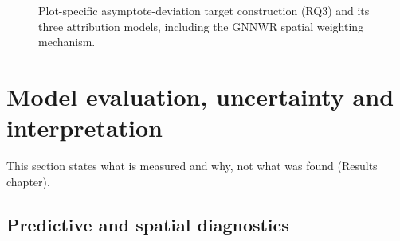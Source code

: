 %
\begin{figure}[!htbp]
\centering
{}
\caption{Plot-specific asymptote-deviation target construction (RQ3) and its three attribution
models, including the GNNWR spatial weighting mechanism.}
\label{fig:rq3-attribution}
\end{figure}

\section{Model evaluation, uncertainty and interpretation}
\label{sec:evaluation}

This section states what is measured and why, not what was found (Results chapter).

\subsection{Predictive and spatial diagnostics}
\label{sec:eval-diagnostics}

